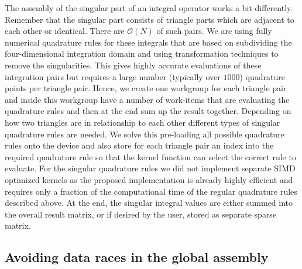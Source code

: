 The assembly of the singular part of an integral operator works a bit differently. Remember that the singular part consists of triangle parts which are adjacent to each other or identical. There are $\mathcal{O}(N)$ of such pairs. We are using fully numerical quadrature rules for these integrals that are based on subdividing the four-dimensional integration domain and using transformation techniques to remove the singularities. This gives highly accurate evaluations of these integration pairs but requires a large number (typically over $1000$) quadrature points per triangle pair. Hence, we create one workgroup for each triangle pair and inside this workgroup have a number of work-items that are evaluating the quadrature rules and then at the end sum up the result together. Depending on how two triangles are in relationship to each other different types of singular quadrature rules are needed. We solve this pre-loading all possible quadrature rules onto the device and also store for each triangle pair an index into the required quadrature rule so that the kernel function can select the correct rule to evaluate. For the singular quadrature rules we did not implement separate SIMD optimized kernels as the proposed implementation is already highly efficient and requires only a fraction of the computational time of the regular quadrature rules described above. At the end, the singular integral values are either summed into the overall result matrix, or if desired by the user, stored as separate sparse matrix.


\subsection{Avoiding data races in the global assembly}


